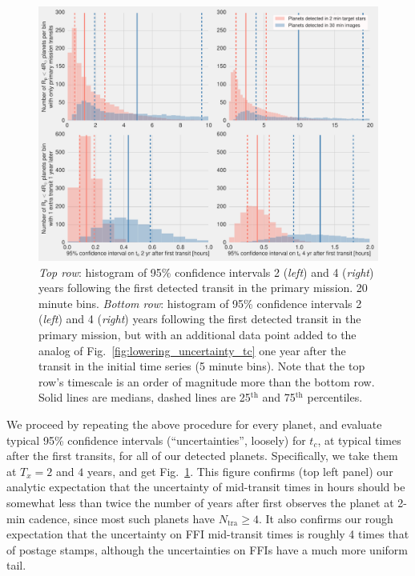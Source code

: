 \begin{figure}[!t]
	\centering
	\includegraphics[scale=1.]{figures/confidence_interval_gets_better.pdf}
	\caption{\textit{Top row}: histogram of 95\% confidence intervals 2 (\textit{left}) and 4 (\textit{right}) years following the first detected transit in the primary mission.
	20 minute bins.
	\textit{Bottom row}: histogram of 95\% confidence intervals 2 (\textit{left}) and 4 (\textit{right}) years following the first detected transit in the primary mission, but with an additional data point added to the analog of Fig.~\protect\ref{fig:lowering_uncertainty_tc} one year after the transit in the initial time series (5 minute bins).
	Note that the top row's timescale is an order of magnitude more than the bottom row.
	Solid lines are medians, dashed lines are 25$^\mathrm{th}$ and 75$^\mathrm{th}$ percentiles.
	} %
	\label{fig:conf_interval_gets_better}
\end{figure}
We proceed by repeating the above procedure for every planet, and evaluate typical 95\% confidence intervals (``uncertainties'', loosely) for $t_c$, at typical times after the first transits, for all of our detected planets.
Specifically, we take them at $T_x=2$ and $4$ years, and get Fig.~\ref{fig:conf_interval_gets_better}.
This figure confirms (top left panel) our analytic expectation that the uncertainty of mid-transit times in hours should be somewhat less than twice the number of years after \tess first observes the planet at 2-min cadence, since most such planets have $N_\mathrm{tra}\geq4$.
It also confirms our rough expectation that the uncertainty on FFI mid-transit times is roughly 4 times that of postage stamps, although the uncertainties on FFIs have a much more uniform tail.


